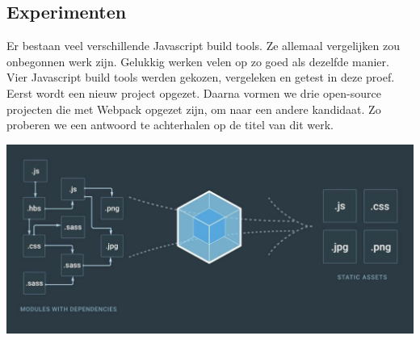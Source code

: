 \begin{multicols}{2}

\color{Black} %
\color{HoGentAccent1} 
\section*{Experimenten}
\color{black}
Er bestaan veel verschillende Javascript build tools. Ze allemaal vergelijken zou onbegonnen werk zijn. Gelukkig werken velen op zo goed als dezelfde manier. 
Vier Javascript build tools werden gekozen, vergeleken en getest in deze proef. Eerst wordt een nieuw project opgezet. Daarna vormen we drie open-source projecten die met Webpack opgezet zijn, om naar een andere kandidaat. Zo proberen we een antwoord te achterhalen op de titel van dit werk.

\color{black}
\begin{center}\vspace{1cm}
\includegraphics[width=1.0\linewidth]{./Webpack.jpg}
\end{center}\vspace{1cm}



\color{HoGentAccent1} 

\end{multicols}
